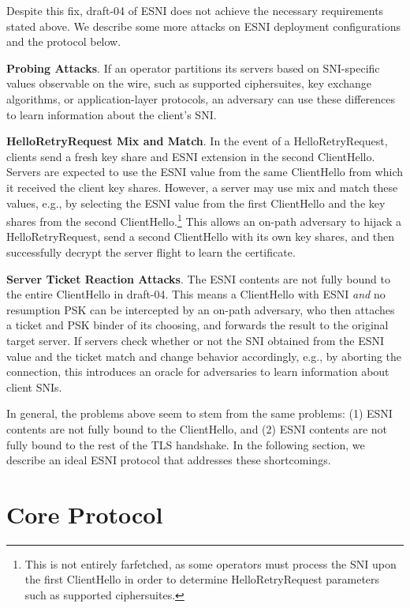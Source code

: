 \documentclass{article}
\theoremstyle{definition}
\begin{document}
Despite this fix, draft-04 of ESNI does not achieve the necessary requirements stated above. We
describe some more attacks on ESNI deployment configurations and the protocol below.

\textbf{Probing Attacks}. If an operator partitions its servers based on SNI-specific values observable
on the wire, such as supported ciphersuites, key exchange algorithms, or application-layer protocols,
an adversary can use these differences to learn information about the client's SNI.

\textbf{HelloRetryRequest Mix and Match}. In the event of a HelloRetryRequest, clients send a fresh
key share and ESNI extension in the second ClientHello. Servers are expected to use the ESNI value
from the same ClientHello from which it received the client key shares. However, a server may use
mix and match these values, e.g., by selecting the ESNI value from the first ClientHello and the key
shares from the second ClientHello.\footnote{This is not entirely farfetched, as some operators must
process the SNI upon the first ClientHello in order to determine HelloRetryRequest parameters such
as supported ciphersuites.} This allows an on-path adversary to hijack a HelloRetryRequest, send a
second ClientHello with its own key shares, and then successfully decrypt the server flight to learn
the certificate.

\textbf{Server Ticket Reaction Attacks}. The ESNI contents are not fully bound to the entire 
ClientHello in draft-04. This means a ClientHello with ESNI \emph{and} no resumption PSK can be 
intercepted by an on-path adversary, who then attaches a ticket and PSK binder of its choosing,
and forwards the result to the original target server. If servers check whether or not the SNI
obtained from the ESNI value and the ticket match and change behavior accordingly, e.g.,
by aborting the connection, this introduces an oracle for adversaries to learn information about
client SNIs.

In general, the problems above seem to stem from the same problems: (1) ESNI contents are not
fully bound to the ClientHello, and (2) ESNI contents are not fully bound to the rest of the TLS
handshake. In the following section, we describe an ideal ESNI protocol that addresses these
shortcomings.

\section{Core Protocol} \label{sec:core} %
\end{document}
